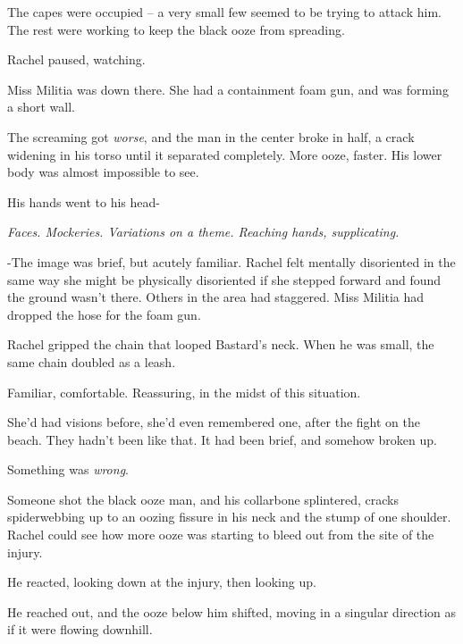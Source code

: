 The capes were occupied – a very small few seemed to be trying to attack him.  The rest were working to keep the black ooze from spreading.



Rachel paused, watching.



Miss Militia was down there.  She had a containment foam gun, and was forming a short wall.



The screaming got \emph{worse}, and the man in the center broke in half, a crack widening in his torso until it separated completely.  More ooze, faster.  His lower body was almost impossible to see.



His hands went to his head-



\emph{Faces.  Mockeries.  Variations on a theme.  Reaching hands, supplicating.}



-The image was brief, but acutely familiar.  Rachel felt mentally disoriented in the same way she might be physically disoriented if she stepped forward and found the ground wasn't there.  Others in the area had staggered.  Miss Militia had dropped the hose for the foam gun.



Rachel gripped the chain that looped Bastard's neck.  When he was small, the same chain doubled as a leash.



Familiar, comfortable.  Reassuring, in the midst of this situation.



She'd had visions before, she'd even remembered one, after the fight on the beach.  They hadn't been like that.  It had been brief, and somehow broken up.



Something was \emph{wrong}.



Someone shot the black ooze man, and his collarbone splintered, cracks spiderwebbing up to an oozing fissure in his neck and the stump of one shoulder.  Rachel could see how more ooze was starting to bleed out from the site of the injury.



He reacted, looking down at the injury, then looking up.



He reached out, and the ooze below him shifted, moving in a singular direction as if it were flowing downhill.




